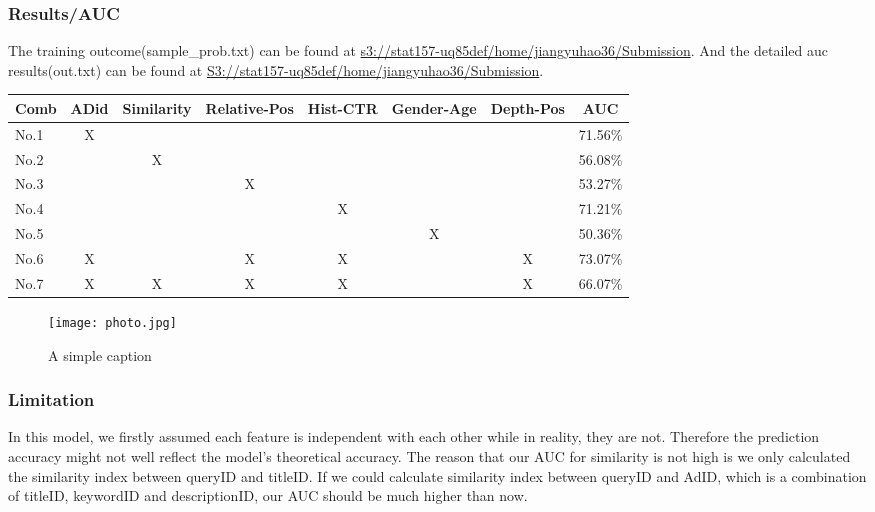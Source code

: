\documentclass[12pt]{article}
\begin{document}
\subsubsection{Results/AUC}
The training outcome(sample\_prob.txt) can be found at \url{s3://stat157-uq85def/home/jiangyuhao36/Submission}. And the detailed auc results(out.txt) can be found at \url{S3://stat157-uq85def/home/jiangyuhao36/Submission}. 




\begin{center}
  \begin{tabular}{ l | c | c | c | c | c | c || c }
    \hline
    Comb & ADid & Similarity & Relative-Pos & Hist-CTR & Gender-Age & Depth-Pos & AUC \\ \hline
    No.1 & X  &  & & & & & 71.56\% \\ \hline
    No.2 &  &X  & & & & & 56.08\% \\ \hline
    No.3 &  &  &X & & & & 53.27\%  \\ \hline
    No.4 &  &  & &X & & & 71.21\% \\ \hline
    No.5 &  &  & & & X & & 50.36\%  \\ \hline
    No.6 &X  &  &X &X & &X & 73.07\% \\ \hline
    No.7 &X  &X  &X &X & &X & 66.07\% \\
    \hline
  \end{tabular}
\end{center}



\begin{figure}[ht!]
\centering
\texttt{[image: photo.jpg]}
\caption{A simple caption \label{overflow}}
\end{figure}



\subsubsection{Limitation }
In this model, we firstly assumed each feature is independent with each other while in reality, they are not. Therefore the prediction accuracy might not well reflect the model’s theoretical accuracy. The reason that our AUC for similarity is not high is we only calculated the similarity index between queryID and titleID. If we could calculate similarity index between queryID and AdID, which is a combination of titleID, keywordID and descriptionID, our AUC should be much higher than now.
\end{document}
